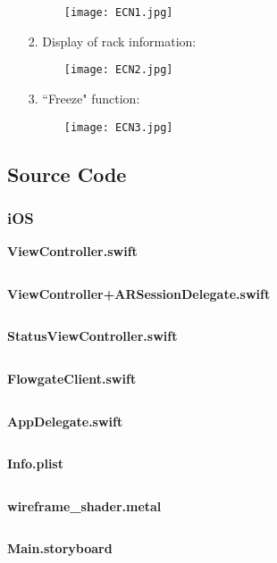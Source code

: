 \documentclass[11pt,a4paper]{article}
\begin{document}
\begin{onehalfspace}
\begin{itemize}
    \begin{figure}[H]
    \centering
    \texttt{[image: ECN1.jpg]}
    \end{figure}
    
    \item[2.] Display of rack information:
    
    \begin{figure}[H]
    \centering
    \texttt{[image: ECN2.jpg]}
    \end{figure}
    
    \item[3.] ``Freeze" function:
    
    \begin{figure}[H]
    \centering
    \texttt{[image: ECN3.jpg]}
    \end{figure}
    
    
\end{itemize}



\subsection{Source Code}
\subsubsection{iOS}
\noindent\textbf{ViewController.swift}
\inputminted{swift}{swift/ViewController.swift}
\noindent\textbf{ViewController+ARSessionDelegate.swift}
\inputminted{swift}{swift/ViewController+ARSessionDelegate.swift}
\noindent\textbf{StatusViewController.swift}
\inputminted{swift}{swift/StatusViewController.swift}
\noindent\textbf{FlowgateClient.swift}
\inputminted{swift}{swift/FlowgateClient.swift}
\noindent\textbf{AppDelegate.swift}
\inputminted{swift}{swift/AppDelegate.swift}
\noindent\textbf{Info.plist}
\inputminted{xml}{swift/Info.plist}
\noindent\textbf{wireframe\_shader.metal}
\inputminted{swift}{swift/wireframe_shader.metal}
\noindent\textbf{Main.storyboard}
\inputminted{xml}{swift/Main.storyboard}

\end{onehalfspace}
\end{document}
